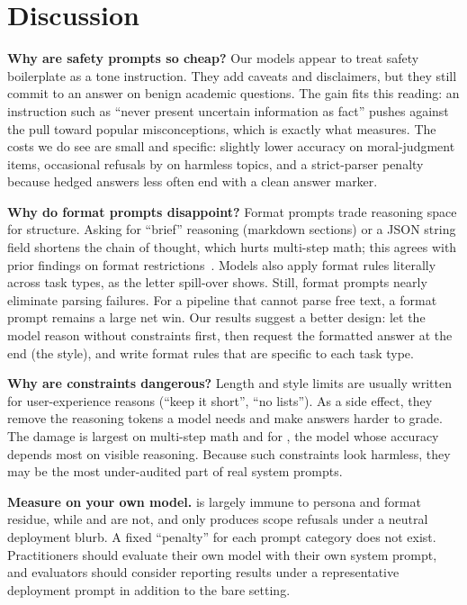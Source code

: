 \section{Discussion}
\label{sec:discussion}

{\bf Why are safety prompts so cheap?} Our models appear to treat safety boilerplate as a tone instruction. They add caveats and disclaimers, but they still commit to an answer on benign academic questions. The \tqa gain fits this reading: an instruction such as ``never present uncertain information as fact'' pushes against the pull toward popular misconceptions, which is exactly what \tqa measures. The costs we do see are small and specific: slightly lower accuracy on moral-judgment items, occasional refusals by \llama on harmless topics, and a strict-parser penalty because hedged answers less often end with a clean answer marker.

{\bf Why do format prompts disappoint?} Format prompts trade reasoning space for structure. Asking for ``brief'' reasoning (markdown sections) or a JSON string field shortens the chain of thought, which hurts multi-step math; this agrees with prior findings on format restrictions~\cite{tam2024speak}. Models also apply format rules literally across task types, as the \drop letter spill-over shows. Still, format prompts nearly eliminate parsing failures. For a pipeline that cannot parse free text, a format prompt remains a large net win. Our results suggest a better design: let the model reason without constraints first, then request the formatted answer at the end (the  style), and write format rules that are specific to each task type.

{\bf Why are constraints dangerous?} Length and style limits are usually written for user-experience reasons (``keep it short'', ``no lists''). As a side effect, they remove the reasoning tokens a model needs and make answers harder to grade. The damage is largest on multi-step math and for \qwentwo, the model whose accuracy depends most on visible reasoning. Because such constraints look harmless, they may be the most under-audited part of real system prompts.

{\bf Measure on your own model.} \qwenthree is largely immune to persona and format residue, while \llama and \qwentwo are not, and only \llama produces scope refusals under a neutral deployment blurb. A fixed ``penalty'' for each prompt category does not exist. Practitioners should evaluate their own model with their own system prompt, and evaluators should consider reporting results under a representative deployment prompt in addition to the bare setting.

